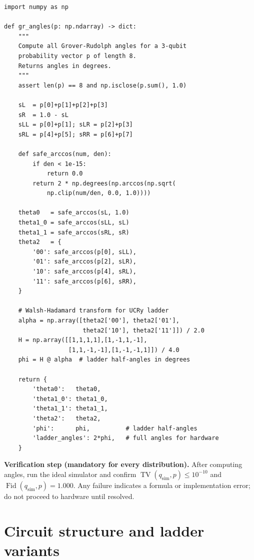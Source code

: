 \documentclass[11pt,a4paper]{article}
\newcommand{\TV}{\operatorname{TV}}
\newcommand{\Fid}{\operatorname{Fid}}
\begin{document}
\begin{lstlisting}[caption={Parametric GR angle computation for any 3-qubit distribution.}]
import numpy as np

def gr_angles(p: np.ndarray) -> dict:
    """
    Compute all Grover-Rudolph angles for a 3-qubit
    probability vector p of length 8.
    Returns angles in degrees.
    """
    assert len(p) == 8 and np.isclose(p.sum(), 1.0)

    sL  = p[0]+p[1]+p[2]+p[3]
    sR  = 1.0 - sL
    sLL = p[0]+p[1]; sLR = p[2]+p[3]
    sRL = p[4]+p[5]; sRR = p[6]+p[7]

    def safe_arccos(num, den):
        if den < 1e-15:
            return 0.0
        return 2 * np.degrees(np.arccos(np.sqrt(
            np.clip(num/den, 0.0, 1.0))))

    theta0   = safe_arccos(sL, 1.0)
    theta1_0 = safe_arccos(sLL, sL)
    theta1_1 = safe_arccos(sRL, sR)
    theta2   = {
        '00': safe_arccos(p[0], sLL),
        '01': safe_arccos(p[2], sLR),
        '10': safe_arccos(p[4], sRL),
        '11': safe_arccos(p[6], sRR),
    }

    # Walsh-Hadamard transform for UCRy ladder
    alpha = np.array([theta2['00'], theta2['01'],
                      theta2['10'], theta2['11']]) / 2.0
    H = np.array([[1,1,1,1],[1,-1,1,-1],
                  [1,1,-1,-1],[1,-1,-1,1]]) / 4.0
    phi = H @ alpha  # ladder half-angles in degrees

    return {
        'theta0':   theta0,
        'theta1_0': theta1_0,
        'theta1_1': theta1_1,
        'theta2':   theta2,
        'phi':      phi,          # ladder half-angles
        'ladder_angles': 2*phi,   # full angles for hardware
    }
\end{lstlisting}

\begin{protocolbox}
\textbf{Verification step (mandatory for every distribution).}
After computing angles, run the ideal simulator and confirm
$\TV(q_{\mathrm{sim}}, p) \leq 10^{-10}$ and
$\Fid(q_{\mathrm{sim}}, p) = 1.000$.
Any failure indicates a formula or implementation error;
do not proceed to hardware until resolved.
\end{protocolbox}

\section{Circuit structure and ladder variants}
\label{sec:circuits}
\end{document}
